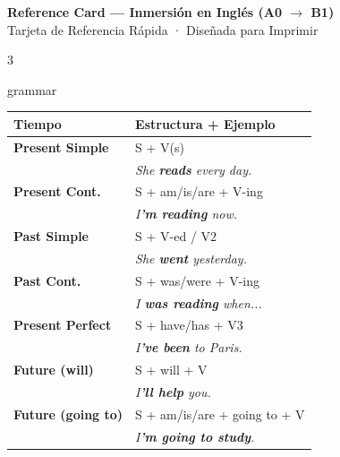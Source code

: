 \documentclass[10pt,a4paper,landscape]{article}
\begin{document}

\begin{center}
{\LARGE\bfseries Reference Card — Inmersión en Inglés (A0 $\rightarrow$ B1)}\\[0.2cm]
{\normalsize\color{grissuave} Tarjeta de Referencia Rápida · Diseñada para Imprimir}
\end{center}

\vspace{0.3cm}

\begin{multicols}{3}

\begin{cajaseccion}{grammar}
{\scriptsize
\begin{tabularx}{\linewidth}{@{} >{\bfseries}l X @{}}
\toprule
\textbf{Tiempo} & \textbf{Estructura + Ejemplo} \\
\midrule
Present Simple & S + V(s) \\
& \textit{She \textbf{reads} every day.} \\[3pt]

Present Cont. & S + am/is/are + V-ing \\
& \textit{I\textbf{'m reading} now.} \\[3pt]

Past Simple & S + V-ed / V2 \\
& \textit{She \textbf{went} yesterday.} \\[3pt]

Past Cont. & S + was/were + V-ing \\
& \textit{I \textbf{was reading} when...} \\[3pt]

Present Perfect & S + have/has + V3 \\
& \textit{I\textbf{'ve been} to Paris.} \\[3pt]

Future (will) & S + will + V \\
& \textit{I\textbf{'ll help} you.} \\[3pt]

Future (going to) & S + am/is/are + going to + V \\
& \textit{I\textbf{'m going to study}.} \\
\bottomrule
\end{tabularx}
}
\end{cajaseccion}


\end{multicols}
\end{document}

